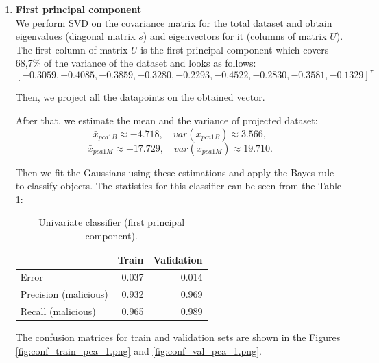 \documentclass[11pt,a4paper]{article}
\begin{document}
\begin{enumerate}
\begin{enumerate}
	\item \textbf {First principal component} \\
	We perform SVD on the covariance matrix for the total dataset and obtain eigenvalues (diagonal matrix $s$) and eigenvectors for it (columns of matrix $U$). The first column of matrix $U$ is the first principal component which covers 68,7\% of the variance of the dataset and looks as follows:
	$$ [-0.3059, -0.4085, -0.3859, -0.3280 , -0.2293, -0.4522, -0.2830 , -0.3581, -0.1329]^\tau $$
	
	Then, we project all the datapoints on the obtained vector.
	
	After that, we estimate the mean and the variance of projected dataset:
	$$\bar{x}_{pca1B} \approx -4.718, \quad var(x_{pca1B}) \approx 3.566, $$
	$$\bar{x}_{pca1M} \approx -17.729, \quad var(x_{pca1M}) \approx 19.710.$$
	
	Then we fit the Gaussians using these estimations and apply the Bayes rule to classify objects.
	The statistics for this classifier can be seen from the Table \ref{tab:results-pca-1}:
	
	\begin{table}[H]
		\centering
		\begin{tabular}{lrr}
			\toprule
			& \textbf{Train} & \textbf{Validation}  \\ \midrule
			Error & 0.037 & 0.014 \\	
			Precision (malicious) & 0.932 & 0.969 \\
			Recall (malicious) & 0.965 & 0.989 \\
			\bottomrule
		\end{tabular}
		\caption{Univariate classifier (first principal component).}
		\label{tab:results-pca-1}
	\end{table}
	
	The confusion matrices for train and validation sets are shown in the Figures \ref{fig:conf_train_pca_1.png} and \ref{fig:conf_val_pca_1.png}.
	

\end{enumerate}
\end{enumerate}
\end{document}
